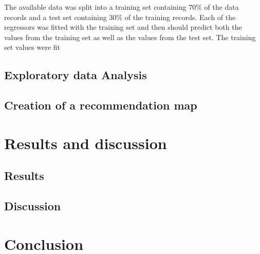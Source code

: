 \documentclass[a4paper, 11pt, oneside]{Thesis}  %
\begin{document}
The available data was split into a training set containing 70\% of the data records and a test set containing 30\% of the training records. Each of the regressors was fitted with the training set and then should predict both the values from the training set as well as the values from the test set. The training set values were fit



\section{Exploratory data Analysis}

\section{Creation of a recommendation map}


\chapter{Results and discussion}

\section{Results}

\section{Discussion}

\chapter{Conclusion}









\backmatter

\label{Bibliography}
\end{document}
